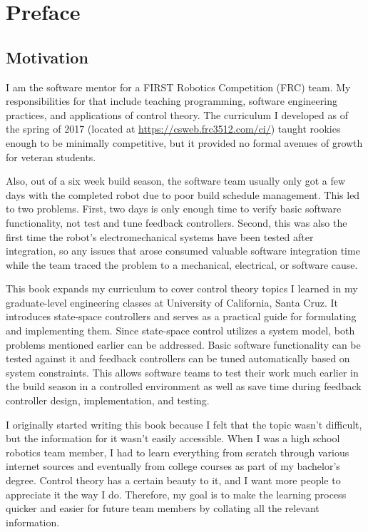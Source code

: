 
\chapter*{Preface}

\section*{Motivation}

I am the software mentor for a FIRST Robotics Competition (FRC) team. My
responsibilities for that include teaching programming, software engineering
practices, and applications of control theory. The curriculum I developed as of
the spring of 2017 (located at \url{https://csweb.frc3512.com/ci/}) taught
rookies enough to be minimally competitive, but it provided no formal avenues of
growth for veteran students.

Also, out of a six week build season, the software team usually only got a few
days with the completed robot due to poor build schedule management. This led to
two problems. First, two days is only enough time to verify basic software
functionality, not test and tune feedback controllers. Second, this was also the
first time the robot's electromechanical systems have been tested after
integration, so any issues that arose consumed valuable software integration
time while the team traced the problem to a mechanical, electrical, or software
cause.

This book expands my curriculum to cover control theory topics I learned in my
graduate-level engineering classes at University of California, Santa Cruz. It
introduces state-space controllers and serves as a practical guide for
formulating and implementing them. Since state-space control utilizes a system
model, both problems mentioned earlier can be addressed. Basic software
functionality can be tested against it and feedback controllers can be tuned
automatically based on system constraints. This allows software teams to test
their work much earlier in the build season in a controlled environment as well
as save time during feedback controller design, implementation, and testing.

I originally started writing this book because I felt that the topic wasn't
difficult, but the information for it wasn't easily accessible. When I was a
high school robotics team member, I had to learn everything from scratch through
various internet sources and eventually from college courses as part of my
bachelor's degree. Control theory has a certain beauty to it, and I want more
people to appreciate it the way I do. Therefore, my goal is to make the learning
process quicker and easier for future team members by collating all the relevant
information.


